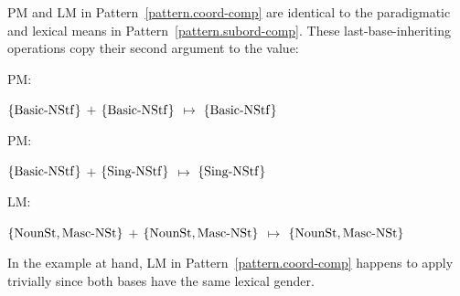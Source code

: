 \documentclass[output=paper
  ,nobabel
  ,draftmode
  ,colorlinks, citecolor=brown
]{langscibook}
\begin{document}
\noindent
PM and LM in Pattern \ref{pattern.coord-comp} are identical to the paradigmatic and lexical
means in Pattern \ref{pattern.subord-comp}. These
last-base-inheriting operations copy their second argument to the value:
\begin{exe}
\ex \begin{xlist}
\ex \raggedright
\begin{labeledlist}{PM:}
\item[PM:] \raggedright $\left\{\smash{\operatorname{Basic-NStf}}\right\}$ $+$ $\left\{\smash{\operatorname{Basic-NStf}}\right\}$ $↦$ $\left\{\smash{\operatorname{Basic-NStf}}\right\}$
\end{labeledlist}
\ex \raggedright
\begin{labeledlist}{PM:}
\item[PM:] \raggedright $\left\{\smash{\operatorname{Basic-NStf}}\right\}$ $+$ $\left\{\smash{\operatorname{Sing-NStf}}\right\}$ $↦$ $\left\{\smash{\operatorname{Sing-NStf}}\right\}$
\end{labeledlist}
\end{xlist}
\end{exe}
\begin{exe}
\ex \raggedright
\begin{labeledlist}{LM:}
\item[LM:] \raggedright $\left\{\smash{\operatorname{NounSt},\operatorname{Masc-NSt}}\right\}$ $+$ $\left\{\smash{\operatorname{NounSt},\operatorname{Masc-NSt}}\right\}$ $↦$ $\left\{\smash{\operatorname{NounSt},\operatorname{Masc-NSt}}\right\}$
\end{labeledlist}
\end{exe}
In the example at hand, LM in Pattern \ref{pattern.coord-comp} happens to apply trivially since both bases have
the same lexical gender.
\end{document}
